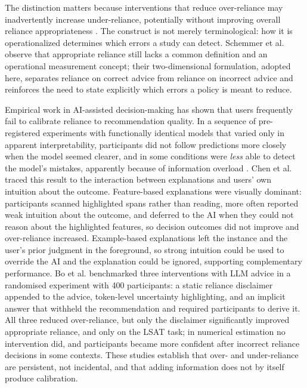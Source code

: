 \documentclass[oneside,final,14pt,a4paper]{extreport}
\begin{document}
The distinction matters because interventions that reduce over-reliance may 
inadvertently increase under-reliance, potentially without improving overall 
reliance appropriateness \cite{Bo2025}. The construct is not merely terminological: how it is
operationalized determines which errors a study can detect. Schemmer et al.
observe that appropriate reliance still lacks a common definition and an
operational measurement concept; their two-dimensional formulation, adopted
here, separates reliance on correct advice from reliance on incorrect advice
and reinforces the need to state explicitly which errors a policy is meant to
reduce.

Empirical work in AI-assisted decision-making has shown that users frequently fail
to calibrate reliance to recommendation quality. In a sequence of pre-registered
experiments with functionally identical models that varied only in apparent
interpretability, participants did not follow predictions more closely when the
model seemed clearer, and in some conditions were \emph{less} able to detect
the model's mistakes, apparently because of information overload
\cite{PoursabziSangdeh2021}. Chen et al. \cite{Chen2023} traced this result to
the interaction between explanations and users' own intuition about the
outcome. Feature-based explanations were visually dominant: participants
scanned highlighted spans rather than reading, more often reported weak
intuition about the outcome, and deferred to the AI when they could not reason
about the highlighted features, so decision outcomes did not improve and
over-reliance increased. Example-based explanations left the instance and the
user's prior judgment in the foreground, so strong intuition could be used to
override the AI and the explanation could be ignored, supporting complementary
performance.
Bo et al. \cite{Bo2025} benchmarked three interventions with LLM advice in a
randomised experiment with 400 participants: a static reliance disclaimer
appended to the advice, token-level uncertainty highlighting, and an implicit
answer that withheld the recommendation and required participants to derive it.
All three reduced over-reliance, but only the disclaimer significantly improved
appropriate reliance, and only on the LSAT task; in numerical estimation no
intervention did, and participants became more confident after incorrect
reliance decisions in some contexts. These studies establish that over- and
under-reliance are persistent, not incidental, and that adding information
does not by itself produce calibration.
\end{document}
